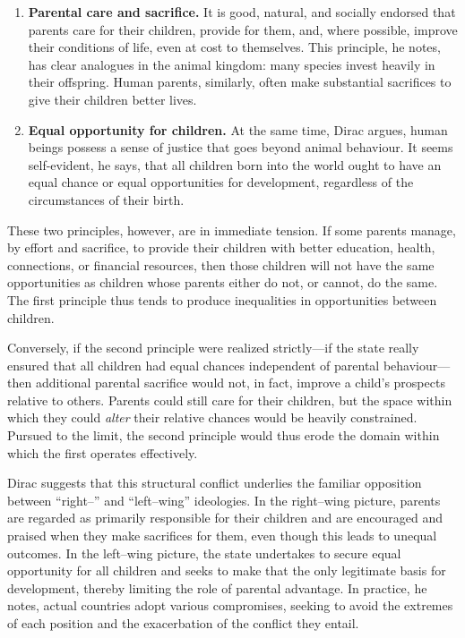 \documentclass[%
  reprint,
  superscriptaddress,
  amsmath,amssymb,
  pra,
  floatfix,
  longbibliography
]{revtex4-2}
\begin{document}
\begin{enumerate}
  \item \textbf{Parental care and sacrifice.}  It is good, natural,
  and socially endorsed that parents care for their children, provide
  for them, and, where possible, improve their conditions of life, even
  at cost to themselves.  This principle, he notes, has clear analogues
  in the animal kingdom: many species invest heavily in their offspring.
  Human parents, similarly, often make substantial sacrifices to give
  their children better lives.

  \item \textbf{Equal opportunity for children.}  At the same time,
  Dirac argues, human beings possess a sense of justice that goes beyond
  animal behaviour.  It seems self-evident, he says, that all children
  born into the world ought to have an equal chance or equal
  opportunities for development, regardless of the circumstances of
  their birth.
\end{enumerate}

These two principles, however, are in immediate tension.  If some
parents manage, by effort and sacrifice, to provide their children with
better education, health, connections, or financial resources, then
those children will not have the same opportunities as children whose
parents either do not, or cannot, do the same.  The first principle
thus tends to produce inequalities in opportunities between children.

Conversely, if the second principle were realized strictly---if the
state really ensured that all children had equal chances independent of
parental behaviour---then additional parental sacrifice would not, in
fact, improve a child's prospects relative to others.  Parents could
still care for their children, but the space within which they could
\emph{alter} their relative chances would be heavily constrained.
Pursued to the limit, the second principle would thus erode the domain
within which the first operates effectively.

Dirac suggests that this structural conflict underlies the familiar
opposition between ``right--'' and ``left--wing'' ideologies.  In the
right--wing picture, parents are regarded as primarily responsible for
their children and are encouraged and praised when they make sacrifices
for them, even though this leads to unequal outcomes.  In the left--wing
picture, the state undertakes to secure equal opportunity for all
children and seeks to make that the only legitimate basis for
development, thereby limiting the role of parental advantage.  In
practice, he notes, actual countries adopt various compromises, seeking
to avoid the extremes of each position and the exacerbation of the
conflict they entail.
\end{document}
